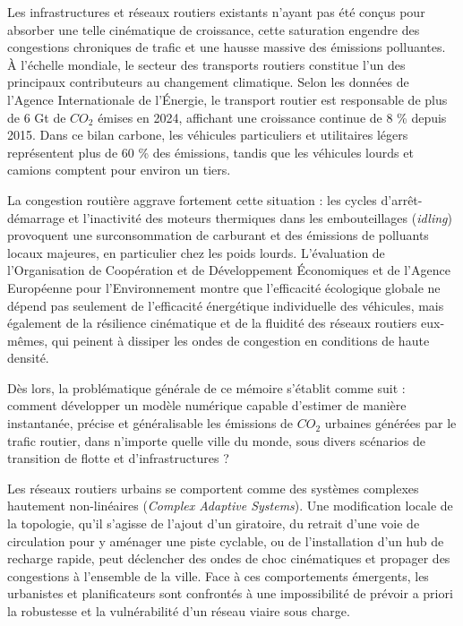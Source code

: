 \documentclass[10pt, a4paper]{article}
\begin{document}
Les infrastructures et réseaux routiers existants n'ayant pas été conçus
pour absorber une telle cinématique de croissance, cette saturation
engendre des congestions chroniques de trafic et une hausse massive des
émissions polluantes. À l'échelle mondiale, le secteur des transports
routiers constitue l'un des principaux contributeurs au changement
climatique. Selon les données de l'Agence Internationale de l'Énergie,
le transport routier est responsable de plus de 6 Gt de \(CO_2\) émises
en 2024, affichant une croissance continue de 8 \% depuis 2015. Dans ce
bilan carbone, les véhicules particuliers et utilitaires légers
représentent plus de 60 \% des émissions, tandis que les véhicules
lourds et camions comptent pour environ un tiers.

La congestion routière aggrave fortement cette situation : les cycles
d'arrêt-démarrage et l'inactivité des moteurs thermiques dans les
embouteillages (\emph{idling}) provoquent une surconsommation de
carburant et des émissions de polluants locaux majeures, en particulier
chez les poids lourds. L'évaluation de l'Organisation de Coopération et
de Développement Économiques et de l'Agence Européenne pour
l'Environnement montre que l'efficacité écologique globale ne dépend pas
seulement de l'efficacité énergétique individuelle des véhicules, mais
également de la résilience cinématique et de la fluidité des réseaux
routiers eux-mêmes, qui peinent à dissiper les ondes de congestion en
conditions de haute densité.

Dès lors, la problématique générale de ce mémoire s'établit comme suit :
comment développer un modèle numérique capable d'estimer de manière
instantanée, précise et généralisable les émissions de \(CO_2\) urbaines
générées par le trafic routier, dans n'importe quelle ville du monde,
sous divers scénarios de transition de flotte et d'infrastructures ?

Les réseaux routiers urbains se comportent comme des systèmes complexes
hautement non-linéaires (\emph{Complex Adaptive Systems}). Une
modification locale de la topologie, qu'il s'agisse de l'ajout d'un
giratoire, du retrait d'une voie de circulation pour y aménager une
piste cyclable, ou de l'installation d'un hub de recharge rapide, peut
déclencher des ondes de choc cinématiques et propager des congestions à
l'ensemble de la ville. Face à ces comportements émergents, les
urbanistes et planificateurs sont confrontés à une impossibilité de
prévoir a priori la robustesse et la vulnérabilité d'un réseau viaire
sous charge.
\end{document}

